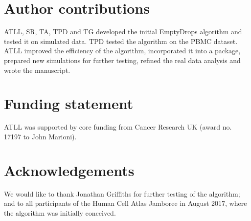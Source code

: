 \documentclass[10pt,letterpaper]{article}
\begin{document}
\section*{Author contributions}
ATLL, SR, TA, TPD and TG developed the initial EmptyDrops algorithm and tested it on simulated data.
TPD tested the algorithm on the PBMC dataset.
ATLL improved the efficiency of the algorithm, incorporated it into a package, prepared new simulations for further testing, refined the real data analysis and wrote the manuscript.

\section*{Funding statement}
ATLL was supported by core funding from Cancer Research UK (award no. 17197 to John Marioni).

\section*{Acknowledgements}
We would like to thank Jonathan Griffiths for further testing of the algorithm;
and to all participants of the Human Cell Atlas Jamboree in August 2017, where the algorithm was initially conceived.



\end{document}
